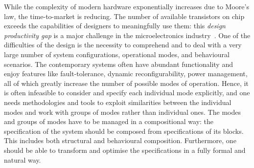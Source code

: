 \thispagestyle{plain}While the complexity of modern hardware exponentially
increases due to Moore's law, the time-to-market is reducing. The
number of available transistors on chip exceeds the capabilities of
designers to meaningfully use them: this \emph{design productivity
gap} is a major challenge in the microelectronics industry~\cite{2009_design_itrs}.
One of the difficulties of the design is the necessity to comprehend
and to deal with a very large number of system configurations, operational
modes, and behavioural scenarios. The contemporary systems often have
abundant functionality and enjoy features like fault-tolerance, dynamic
reconfigurability, power management, all of which greatly increase
the number of possible modes of operation. Hence, it is often infeasible
to consider and specify each individual mode explicitly, and one needs
methodologies and tools to exploit similarities between the individual
modes and work with groups of modes rather than individual ones. The
modes and groups of modes have to be managed in a compositional way:
the specification of the system should be composed from specifications
of its blocks. This includes both structural and behavioural composition.
Furthermore, one should be able to transform and optimise the specifications
in a fully formal and natural way.


